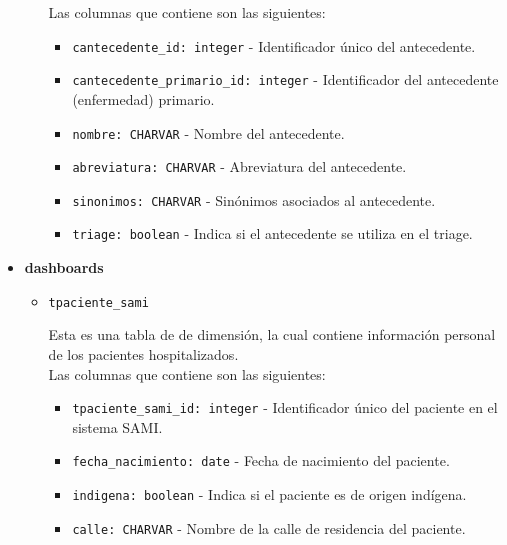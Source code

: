 \begin{itemize}
\begin{itemize}
        Las columnas que contiene son las siguientes:
        \begin{itemize}
            \item \texttt{cantecedente\_id: integer} - Identificador único del antecedente.
            
            \item \texttt{cantecedente\_primario\_id: integer} - Identificador del antecedente (enfermedad) primario.
            
            \item \texttt{nombre: CHARVAR} - Nombre del antecedente.
            
            \item \texttt{abreviatura: CHARVAR} - Abreviatura del antecedente.
            
            \item \texttt{sinonimos: CHARVAR} - Sinónimos asociados al antecedente.
            
            \item \texttt{triage: boolean} - Indica si el antecedente se utiliza en el triage.
        \end{itemize}

    \end{itemize}
        
    
    \item \textbf{dashboards}
        \begin{itemize}
            \item \texttt{tpaciente\_sami}

            Esta es una tabla de de dimensión, la cual contiene información personal de los pacientes hospitalizados. \\

            Las columnas que contiene son las siguientes: 

            \begin{itemize}
                \item \texttt{tpaciente\_sami\_id: integer} - Identificador único del paciente en el sistema SAMI.
                
                \item \texttt{fecha\_nacimiento: date} - Fecha de nacimiento del paciente.
                
                \item \texttt{indigena: boolean} - Indica si el paciente es de origen indígena.
                
                \item \texttt{calle: CHARVAR} - Nombre de la calle de residencia del paciente.
                

\end{itemize}
\end{itemize}
\end{itemize}

